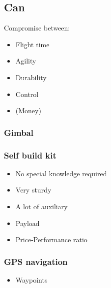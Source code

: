 \subsection{Can}


\begin{frame}
  Compromise between:
  \begin{itemize}
    \item Flight time
    \item Agility
    \item Durability
    \item Control
	\item (Money)
		
  \end{itemize}
\end{frame}



\begin{frame}

\frametitle{Gimbal}


\frametitle{Self build kit}

  \begin{itemize}
    \item No special knowledge required    
	\item Very sturdy
	\item A lot of auxiliary
	\item Payload    
	\item Price-Performance ratio
  \end{itemize}

  
\end{frame}

\begin{frame}
\frametitle{GPS navigation}

  \begin{itemize}
    \item Waypoints
  \end{itemize}

    
\end{frame}

